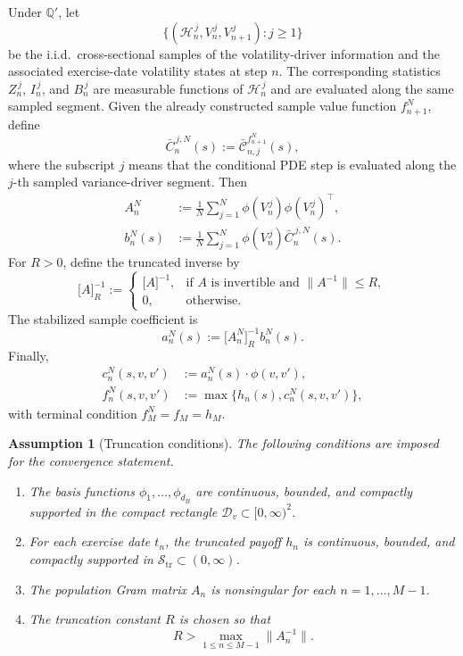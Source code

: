 \documentclass[pdflatex,sn-mathphys-num]{sn-jnl}
\theoremstyle{thmstyleone}%
\theoremstyle{thmstylethree}%
\newtheorem{assumption}[theorem]{Assumption}
\theoremstyle{thmstyletwo}%
\newcommand{\Q}{\mathbb Q}
\begin{document}
Under $\Q'$, let
\[
    \{(\mathcal H_n^{\,j},V_n^{\,j},V_{n+1}^{\,j}):j\ge1\}
\]
be the i.i.d.\ cross-sectional samples of the volatility-driver information and
the associated exercise-date volatility states at step $n$. The corresponding
statistics $Z_n^{\,j}$, $I_n^{\,j}$, and $B_n^{\,j}$ are measurable functions of
$\mathcal H_n^{\,j}$ and are evaluated along the same sampled segment. Given the
already constructed sample value function $f_{n+1}^N$, define
\[
\bar C_{n}^{\,j,N}(s)
:=
    \bar{\mathcal C}_{n,j}^{f_{n+1}^N}(s),
\]
where the subscript $j$ means that the conditional PDE step is evaluated along
the $j$-th sampled variance-driver segment. Then
\[
\begin{aligned}
    A_n^N
    &:=
    \frac1N\sum_{j=1}^N
        \phi(V_n^{\,j})\phi(V_n^{\,j})^\top,\\
    b_n^N(s)
    &:=
    \frac1N\sum_{j=1}^N
        \phi(V_n^{\,j})\bar C_n^{\,j,N}(s).
\end{aligned}
\]
For $R>0$, define the truncated inverse by
\begin{equation}
\bigl[A\bigr]^{-1}_R
:=
\begin{cases}
\bigl[A\bigr]^{-1},
&\text{if \(A\) is invertible and }\|A^{-1}\|\le R,\\
0,
&\text{otherwise.}
\end{cases}
\label{eq:estimated_coeff}
\end{equation}
The stabilized sample coefficient is
\[
    a_n^N(s):=\bigl[A_n^N\bigr]^{-1}_R b_n^N(s).
\]
Finally,
\[
\begin{aligned}
    c_n^N(s,v,v')&:=a_n^N(s)\cdot\phi(v,v'),\\
    f_n^N(s,v,v')&:=\max\{h_n(s),c_n^N(s,v,v')\},
\end{aligned}
\]
with terminal condition $f_M^N=f_M=h_M$.


\begin{assumption}[Truncation conditions]
\label{ass:truncation}
The following conditions are imposed for the convergence statement.

\begin{enumerate}
    \item The basis functions $\phi_1,\ldots,\phi_{d_B}$ are continuous,
    bounded, and compactly supported in the compact rectangle
    $\mathcal D_v\subset[0,\infty)^2$.

    \item For each exercise date $t_n$, the truncated payoff $h_n$ is
    continuous, bounded, and compactly supported in
    $\mathcal S_{\mathrm{tr}}\subset(0,\infty)$.

    \item The population Gram matrix $A_n$ is nonsingular for each
    $n=1,\ldots,M-1$.

    \item The truncation constant $R$ is chosen so that
    \[
        R>\max_{1\le n\le M-1}\|A_n^{-1}\|.
    \]
\end{enumerate}
\end{assumption}
\end{document}
